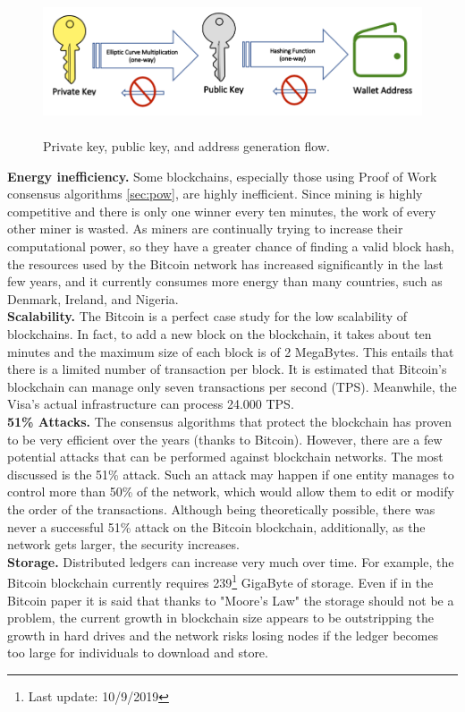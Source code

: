 \begin{figure}[h]
    \centering
    \includegraphics[height=4.3cm]{key_generation.png}
    \caption{Private key, public key, and address generation flow.\cite{key}}
    \label{fig:key}
\end{figure}\bigskip
\textbf{Energy inefficiency.}
Some blockchains, especially those using Proof of Work consensus algorithms \ref{sec:pow}, are 
highly inefficient. Since mining is highly competitive and there is 
only one winner every ten minutes, the work of every other miner is wasted.
As miners are continually trying to increase their computational power, 
so they have a greater chance of finding a valid block hash, the resources used 
by the Bitcoin network has increased significantly in the last few years, and it 
currently consumes more energy than many countries, such as Denmark, Ireland, 
and Nigeria.\cite{binancevision}
\bigskip\\
\textbf{Scalability.}
The Bitcoin is a perfect case study for the low scalability of blockchains.
In fact, to add a new block on the blockchain, it takes about ten minutes and
the maximum size of each block is of 2 MegaBytes. This entails that there is a
limited number of transaction per block. It is estimated that Bitcoin's 
blockchain can manage only seven transactions per second (TPS). Meanwhile, the
Visa's actual infrastructure can process 24.000 TPS.\cite{investopedia}\pagebreak
\bigskip\\
\textbf{51\% Attacks.}
The consensus algorithms that protect the blockchain has proven to be very 
efficient over the years (thanks to Bitcoin). However, there are a few potential attacks that can 
be performed against blockchain networks. The most discussed is the  51\% attack.
Such an attack may happen if one entity manages to control more than 50\% of the 
network, which would allow them to edit or modify the order of the transactions.
Although being theoretically possible, there was never a successful 51\% attack on 
the Bitcoin blockchain, additionally, as the network gets larger, the security 
increases.\cite{binancevision}
\bigskip\\
\textbf{Storage.}
Distributed ledgers can increase very much over time. For example, the Bitcoin blockchain
currently requires 239\footnote{Last update: 10/9/2019} GigaByte of storage. Even if in 
the Bitcoin paper it is said that thanks to "Moore's Law"\cite{bitcoin} the storage should
not be a problem, the current growth in blockchain size appears to be outstripping the growth
in hard drives and the network risks losing nodes if the ledger becomes too large for 
individuals to download and store.\cite{binancevision}


